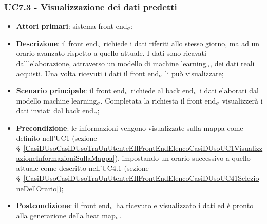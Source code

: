 \subsubsection{UC7.3 - Visualizzazione dei dati predetti}\label{CasiDUsoCasiDUsoTraIlFrontEndEIlBackEndElencoDeiCasiDUsoUC73VisualizzazioneDeiDatiPredetti}
\begin{itemize}
	\item \textbf{Attori primari}: sistema front end$_{\scaleto{G}{3pt}}$;
	\item \textbf{Descrizione}: il front end$_{\scaleto{G}{3pt}}$ richiede i dati riferiti allo stesso giorno, ma ad un orario avanzato rispetto a quello attuale.
	I dati sono ricavati dall’elaborazione, attraverso un modello di machine learning$_{\scaleto{G}{3pt}}$, dei dati reali acquisti. Una volta ricevuti i dati il front end$_{\scaleto{G}{3pt}}$ li può visualizzare;
	\item \textbf{Scenario principale}: il front end$_{\scaleto{G}{3pt}}$ richiede al back end$_{\scaleto{G}{3pt}}$ i dati elaborati dal modello machine learning$_{\scaleto{G}{3pt}}$. Completata la richiesta il front end$_{\scaleto{G}{3pt}}$ visualizzerà i dati inviati dal back end$_{\scaleto{G}{3pt}}$;
	\item \textbf{Precondizione}: le informazioni vengono visualizzate sulla mappa come definito nell’UC1 (sezione \S~\ref{CasiDUsoCasiDUsoTraUnUtenteEIlFrontEndElencoCasiDUsoUC1VisualizzazioneInformazioniSullaMappa}), impostando un orario successivo a quello attuale come descritto nell’UC4.1 (sezione \S~\ref{CasiDUsoCasiDUsoTraUnUtenteEIlFrontEndElencoCasiDUsoUC41SelezioneDellOrario});
	\item \textbf{Postcondizione}: il front end$_{\scaleto{G}{3pt}}$ ha ricevuto e visualizzato i dati ed è pronto alla generazione della heat map$_{\scaleto{G}{3pt}}$. 
\end{itemize}

